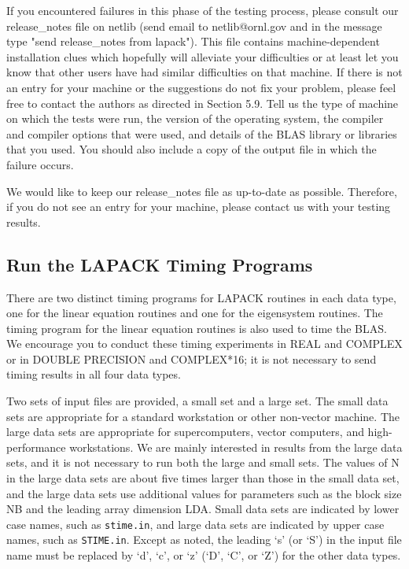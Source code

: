\begin{itemize}
\end{itemize}

If you encountered failures in this phase of the testing process, please
consult our release\_notes file on netlib (send email to netlib@ornl.gov
and in the message type "send release\_notes from lapack").  This file
contains machine-dependent installation clues which hopefully will 
alleviate your difficulties or at least let you know that other users
have had similar difficulties on that machine.  If there is not an entry
for your machine or the suggestions do not fix your problem, please feel
free to contact the authors as directed in Section 5.9.  Tell us the 
type of machine on which the tests were run, the version of the operating
system, the compiler and compiler options that were used,
and details of the BLAS library or libraries that you used.  You should
also include a copy of the output file in which the failure occurs.

We would like to keep our release\_notes file as up-to-date as possible.
Therefore, if you do not see an entry for your machine, please contact us
with your testing results.

\subsection{Run the LAPACK Timing Programs}

\dent
There are two distinct timing programs for LAPACK routines
in each data type, one for the linear equation routines and
one for the eigensystem routines.  The timing program for the
linear equation routines is also used to time the BLAS.
We encourage you to conduct these timing experiments
in REAL and COMPLEX or in DOUBLE PRECISION and COMPLEX*16; it is
not necessary to send timing results in all four data types.

Two sets of input files are provided, a small set and a large set.
The small data sets are appropriate for a standard workstation or
other non-vector machine.
The large data sets are appropriate for supercomputers, vector
computers, and high-performance workstations.
We are mainly interested in results from the large data sets, and
it is not necessary to run both the large and small sets.
The values of N in the large data sets are about five times larger
than those in the small data set,
and the large data sets use additional values for parameters such as the
block size NB and the leading array dimension LDA.
Small data sets are indicated by lower case names, such as
{\tt stime.in}, and large data sets are indicated by upper case names,
such as {\tt STIME.in}.
Except as noted, the leading `s' (or `S') in the input file name must be
replaced by `d', `c', or `z' (`D', `C', or `Z') for the other data types.

